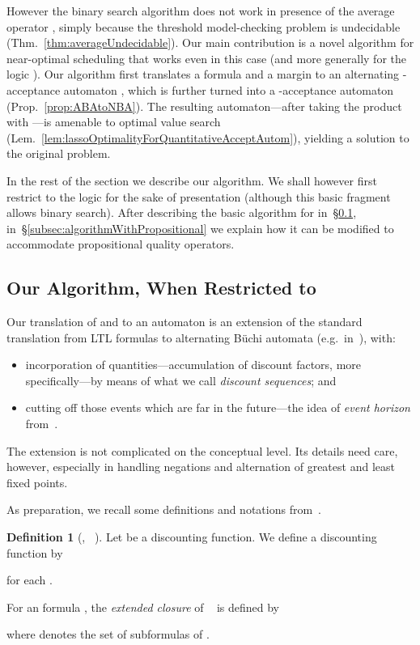 \documentclass[a4paper,USenglish,numberwithinsect]{lipics}
\theoremstyle{definition}
\newtheorem{defi}{Definition}[section]
\theoremstyle{remark}
\theoremstyle{plain}
\begin{document}
However the binary search algorithm does not work in presence of the
average operator , simply because the threshold model-checking
problem is undecidable (Thm.~\ref{thm:averageUndecidable}). Our main
contribution is a novel algorithm for near-optimal scheduling
that works even in this case (and more generally for the logic
). 
Our algorithm  first translates a formula  and a margin
 to an
alternating
-acceptance automaton , which is further
turned into a -acceptance automaton 
(Prop.~\ref{prop:ABAtoNBA}). The resulting automaton---after  taking the
product  
with ---is amenable to optimal value search
(Lem.~\ref{lem:lassoOptimalityForQuantitativeAcceptAutom}), yielding
a solution to the original problem.









In the rest of the section we describe our algorithm.
We shall however  first
  restrict to the logic 
 for the sake of presentation (although this basic fragment allows binary
search). After describing
the basic algorithm for 
in~\S{}\ref{subsec:algorithmWithoutPropositional},
in~\S{}\ref{subsec:algorithmWithPropositional} we explain how it can be
modified to accommodate propositional quality operators.





\subsection{Our Algorithm, When Restricted to
  }\label{subsec:algorithmWithoutPropositional}
Our translation of   and
 to an automaton 
 is  an extension of the standard
translation from LTL formulas to alternating B\"{u}chi automata (e.g.\
in~\cite{Vardi96anautomata-theoretic}), with: 
\begin{itemize}
 \item  incorporation of
quantities---accumulation of discount factors, more specifically---by
	means of what we call \emph{discount sequences}; and
 \item cutting off those events which are  far in the future---the idea of \emph{event horizon} from~\cite{AlmagorBK14}.
\end{itemize}
The extension is not complicated on the conceptual level. Its
details need care, however, especially in handling negations and alternation of
greatest and least fixed points. 

As preparation, we recall some definitions and notations from~\cite{AlmagorBK14}. 
\begin{defi}[, ~\cite{AlmagorBK14}]
 Let  be a discounting function. We define a discounting
 function  by
  
for each .


For an  formula , the
 \emph{extended closure}  of
 ~\cite{AlmagorBK14} is defined by 

where  denotes the set of subformulas of .
\end{defi}
\end{document}

